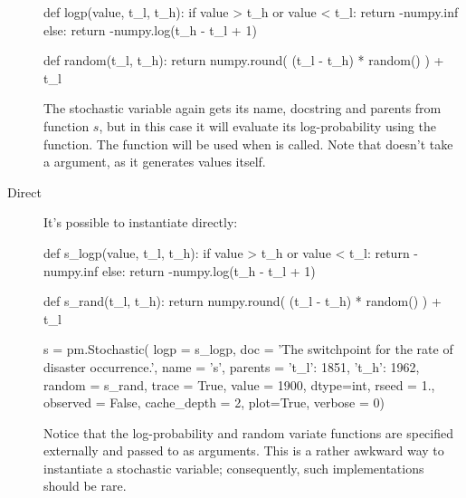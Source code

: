 \documentclass[]{jss}
\begin{document}
\begin{description}
\begin{CodeInput}
def logp(value, t_l, t_h):
    if value > t_h or value < t_l:
        return -numpy.inf
    else:
        return -numpy.log(t_h - t_l + 1)

def random(t_l, t_h):
    return numpy.round( (t_l - t_h) * random() ) + t_l

\end{CodeInput}
The stochastic variable again gets its name, docstring and parents from function $s$, but in this case it will evaluate its log-probability using the  function. The  function will be used when  is called. Note that  doesn't take a  argument, as it generates values itself.

    \item[Direct] It's possible to instantiate  directly:
\begin{CodeInput}
def s_logp(value, t_l, t_h):
if value > t_h or value < t_l:
    return -numpy.inf
else:
    return -numpy.log(t_h - t_l + 1)

def s_rand(t_l, t_h):
return numpy.round( (t_l - t_h) * random() ) + t_l

s = pm.Stochastic( logp = s_logp,
            doc = 'The switchpoint for the rate of disaster occurrence.',
            name = 's',
            parents = {'t_l': 1851, 't_h': 1962},
            random = s_rand,
            trace = True,
            value = 1900,
            dtype=int,
            rseed = 1.,
            observed = False,
            cache_depth = 2,
            plot=True,
            verbose = 0)
\end{CodeInput}
Notice that the log-probability and random variate functions are specified externally and passed to  as arguments. This is a rather awkward way to instantiate a stochastic variable; consequently, such implementations should be rare.

\end{description}
\end{document}
